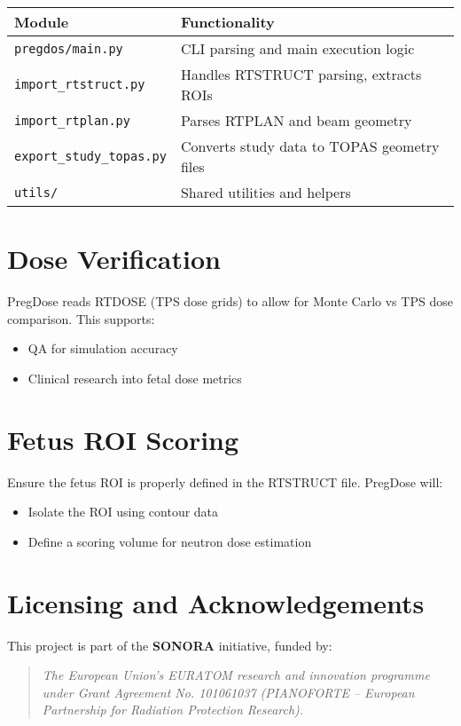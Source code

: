 \documentclass[11pt]{article}
\begin{document}
\begin{longtable}{|l|p{10cm}|}
\hline
\textbf{Module} & \textbf{Functionality} \\
\hline
\texttt{pregdos/main.py} & CLI parsing and main execution logic \\
\texttt{import\_rtstruct.py} & Handles RTSTRUCT parsing, extracts ROIs \\
\texttt{import\_rtplan.py} & Parses RTPLAN and beam geometry \\
\texttt{export\_study\_topas.py} & Converts study data to TOPAS geometry files \\
\texttt{utils/} & Shared utilities and helpers \\
\hline
\end{longtable}

\section{Dose Verification}

PregDose reads RTDOSE (TPS dose grids) to allow for Monte Carlo vs TPS dose comparison. This supports:
\begin{itemize}
    \item QA for simulation accuracy
    \item Clinical research into fetal dose metrics
\end{itemize}

\section{Fetus ROI Scoring}

Ensure the fetus ROI is properly defined in the RTSTRUCT file. PregDose will:
\begin{itemize}
    \item Isolate the ROI using contour data
    \item Define a scoring volume for neutron dose estimation
\end{itemize}

\section{Licensing and Acknowledgements}

This project is part of the \textbf{SONORA} initiative, funded by:

\begin{quote}
\textit{The European Union’s EURATOM research and innovation programme under Grant Agreement No. 101061037 (PIANOFORTE – European Partnership for Radiation Protection Research).}
\end{quote}
\end{document}
